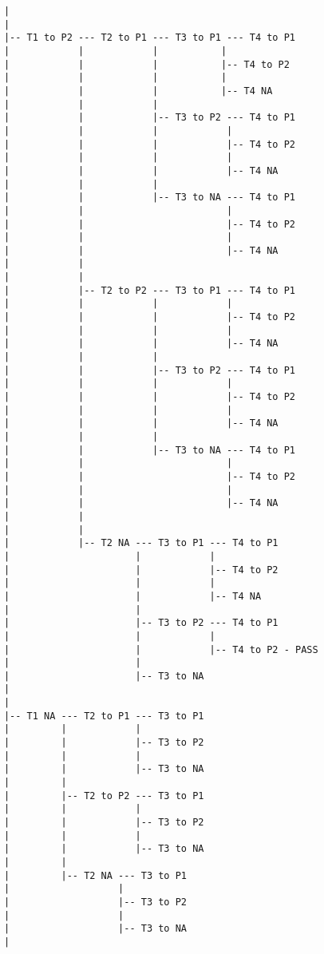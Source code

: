 \documentclass{article}
\begin{document}
\begin{enumerate}
\begin{enumerate}
\begin{verbatim}
			|             
			|             
			|-- T1 to P2 --- T2 to P1 --- T3 to P1 --- T4 to P1
			|            |            |           |
			|            |            |           |-- T4 to P2
			|            |            |           |
			|            |            |           |-- T4 NA
			|            |            |            
			|            |            |-- T3 to P2 --- T4 to P1
			|            |            |            |
			|            |            |            |-- T4 to P2
			|            |            |            |
			|            |            |            |-- T4 NA
			|            |            |
			|            |            |-- T3 to NA --- T4 to P1
			|            |                         |
			|            |                         |-- T4 to P2
			|            |                         |
			|            |                         |-- T4 NA
			|            |
			|            |
			|            |-- T2 to P2 --- T3 to P1 --- T4 to P1
			|            |            |            |
			|            |            |            |-- T4 to P2
			|            |            |            |
			|            |            |            |-- T4 NA
			|            |            |            
			|            |            |-- T3 to P2 --- T4 to P1
			|            |            |            |
			|            |            |            |-- T4 to P2
			|            |            |            |
			|            |            |            |-- T4 NA
			|            |            |
			|            |            |-- T3 to NA --- T4 to P1
			|            |                         |
			|            |                         |-- T4 to P2
			|            |                         |
			|            |                         |-- T4 NA
			|            |
			|            |
			|            |-- T2 NA --- T3 to P1 --- T4 to P1
			|                      |            |
			|                      |            |-- T4 to P2
			|                      |            |
			|                      |            |-- T4 NA
			|                      |            
			|                      |-- T3 to P2 --- T4 to P1
			|                      |            |
			|                      |            |-- T4 to P2 - PASS
			|                      |            
			|                      |-- T3 to NA
			|                                      
			|                                      
			|-- T1 NA --- T2 to P1 --- T3 to P1
			|         |            |                     
			|         |            |-- T3 to P2 
			|         |            |            
			|         |            |-- T3 to NA 
			|         |                         
			|         |-- T2 to P2 --- T3 to P1
			|         |            |                  
			|         |            |-- T3 to P2 
			|         |            |            
			|         |            |-- T3 to NA 
			|         |                         
			|         |-- T2 NA --- T3 to P1 
			|                   |                      
			|                   |-- T3 to P2
			|                   |            
			|                   |-- T3 to NA                                      
			|                                      
			\end{verbatim}
			

\end{enumerate}
\end{enumerate}
\end{document}
